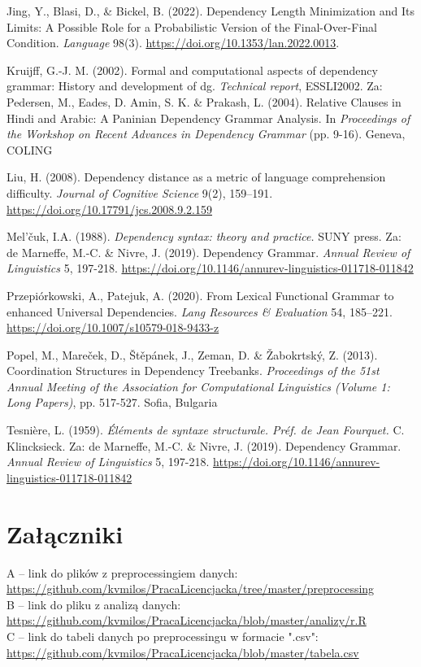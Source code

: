 \documentclass[licencjacka]{pracamgr_Kogni}
\begin{document}
\begin{thebibliography}{99}
Jing, Y., Blasi, D., \& Bickel, B. (2022). Dependency Length Minimization and Its Limits: A Possible Role for a Probabilistic Version of the Final-Over-Final Condition. \textit{Language} 98(3). \url{https://doi.org/10.1353/lan.2022.0013}. 

Kruijff, G.-J. M. (2002). Formal and computational aspects of dependency grammar: History and development of dg. \textit{Technical report}, ESSLI2002. Za: Pedersen, M., Eades, D. Amin, S. K. \& Prakash, L. (2004). Relative Clauses in Hindi and Arabic: A Paninian Dependency Grammar Analysis. In \textit{Proceedings of the Workshop on Recent Advances in Dependency Grammar} (pp. 9-16). Geneva, COLING

Liu, H. (2008). Dependency distance as a metric of language comprehension difficulty. \textit{Journal of Cognitive Science} 9(2), 159–191. \url{https://doi.org/10.17791/jcs.2008.9.2.159}

Mel'čuk, I.A. (1988). \textit{Dependency syntax: theory and practice.} SUNY press. Za: de Marneffe, M.-C. \& Nivre, J. (2019). Dependency Grammar. \textit{Annual Review of Linguistics} 5, 197-218. \url{https://doi.org/10.1146/annurev-linguistics-011718-011842}

Przepiórkowski, A., Patejuk, A. (2020). From Lexical Functional Grammar to enhanced Universal Dependencies. \textit{Lang Resources \& Evaluation} 54, 185–221. \url{https://doi.org/10.1007/s10579-018-9433-z}

Popel, M., Mareček, D., Štěpánek, J., Zeman, D. \& Žabokrtský, Z. (2013). Coordination Structures in Dependency Treebanks. \textit{Proceedings of the 51st Annual Meeting of the Association for Computational Linguistics (Volume 1: Long Papers)}, pp. 517-527. Sofia, Bulgaria


Tesnière, L. (1959). \textit{Éléments de syntaxe structurale. Préf. de Jean Fourquet.} C. Klincksieck. Za: de Marneffe, M.-C. \& Nivre, J. (2019). Dependency Grammar. \textit{Annual Review of Linguistics} 5, 197-218. \url{https://doi.org/10.1146/annurev-linguistics-011718-011842}

\end{thebibliography}


\chapter*{Załączniki}

A -- link do plików z preprocessingiem danych: \url{https://github.com/kvmilos/PracaLicencjacka/tree/master/preprocessing} \\
B -- link do pliku z analizą danych: \url{https://github.com/kvmilos/PracaLicencjacka/blob/master/analizy/r.R} \\
C -- link do tabeli danych po preprocessingu w formacie ".csv": \url{https://github.com/kvmilos/PracaLicencjacka/blob/master/tabela.csv}
\end{document}
